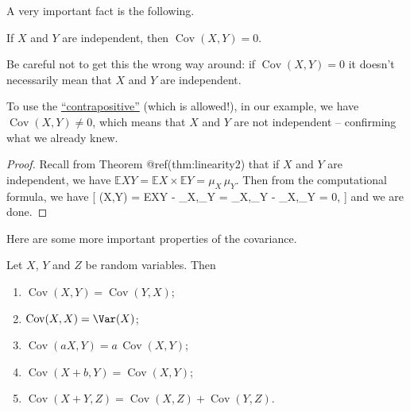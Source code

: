 \documentclass[
  letterpaper,
]{report}
\providecommand{\tightlist}{%
  \setlength{\itemsep}{0pt}\setlength{\parskip}{0pt}}\usepackage{longtable,booktabs,array}
\theoremstyle{definition}
\theoremstyle{definition}
\theoremstyle{remark}
\begin{document}
A very important fact is the following.

If \(X\) and \(Y\) are independent, then
\(\operatorname{Cov}(X,Y) = 0\).

Be careful not to get this the wrong way around: if
\(\operatorname{Cov}(X,Y) = 0\) it doesn't necessarily mean that \(X\)
and \(Y\) are independent.

To use the
\href{https://www.varsitytutors.com/hotmath/hotmath_help/topics/converse-inverse-contrapositive}{``contrapositive''}
(which is allowed!), in our example, we have
\(\operatorname{Cov}(X,Y) \neq 0\), which means that \(X\) and \(Y\) are
not independent -- confirming what we already knew.

\begin{proof}

Recall from Theorem @ref(thm:linearity2) that if \(X\) and \(Y\) are
independent, we have
\(\mathbb EXY = \mathbb EX \times \mathbb EY = \mu_X \, \mu_Y\). Then
from the computational formula, we have {[} (X,Y) =
\mathbb EXY - \mu\_X,\mu\_Y = \mu\_X,\mu\_Y - \mu\_X,\mu\_Y = 0, {]} and
we are done.

\end{proof}

Here are some more important properties of the covariance.

Let \(X\), \(Y\) and \(Z\) be random variables. Then

\begin{enumerate}
\def\labelenumi{\arabic{enumi}.}
\tightlist
\item
  \(\operatorname{Cov}(X,Y) = \operatorname{Cov}(Y,X)\);
\item
  \(\operatorname{Cov}(X,X) = \Var(X)\);
\item
  \(\operatorname{Cov}(aX, Y) = a\,\operatorname{Cov}(X,Y)\);
\item
  \(\operatorname{Cov}(X + b, Y) = \operatorname{Cov}(X,Y)\);
\item
  \(\operatorname{Cov}(X + Y, Z) = \operatorname{Cov}(X, Z) + \operatorname{Cov}(Y,Z)\).
\end{enumerate}
\end{document}
